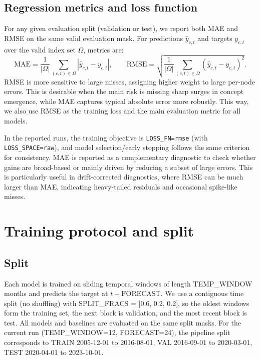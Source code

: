 \documentclass[pdflatex,sn-basic]{sn-jnl}
\begin{document}
\subsection{Regression metrics and loss function}
For any given evaluation split (validation or test), we report both MAE and RMSE on the same valid evaluation mask. For predictions $\hat{y}_{c,t}$ and targets $y_{c,t}$ over
the valid index set $\Omega$, metrics are:
\[
\mathrm{MAE}=\frac{1}{|\Omega|}\sum_{(c,t)\in\Omega}\left|\hat{y}_{c,t}-y_{c,t}\right|,
\qquad
\mathrm{RMSE}=\sqrt{\frac{1}{|\Omega|}\sum_{(c,t)\in\Omega}\left(\hat{y}_{c,t}-y_{c,t}\right)^2}.
\]
RMSE is more sensitive to large misses, assigning higher weight to large per-node errors. This is desirable when the main risk is missing sharp surges in concept emergence, while MAE captures typical absolute error more robustly.
This way, we also use RMSE as the training loss and the main evaluation metric for all models. 
\newline

In the reported runs, the training objective is \texttt{LOSS\_FN=rmse} (with \texttt{LOSS\_SPACE=raw}),
and model selection/early stopping follows the same criterion for consistency. MAE is reported as a
complementary diagnostic to check whether gains are broad-based or mainly driven by reducing a subset
of large errors. This is particularly useful in drift-corrected diagnostics, where RMSE can be much
larger than MAE, indicating heavy-tailed residuals and occasional spike-like misses.




\section{Training protocol and split}
\subsection{Split}
Each model is trained on sliding temporal windows of length
TEMP\_WINDOW months and predicts the target at $t+\text{FORECAST}$.
We use a contiguous time split (no shuffling) with SPLIT\_FRACS = [0.6, 0.2, 0.2],
so the oldest windows form the training set, the next block is validation, and the most recent
block is test. All models and baselines are evaluated on the same split masks.
For the current run (TEMP\_WINDOW=12, FORECAST=24), the pipeline split corresponds to
TRAIN 2005-12-01 to 2016-08-01, VAL 2016-09-01 to 2020-03-01, TEST 2020-04-01 to 2023-10-01.
\newline
\end{document}
